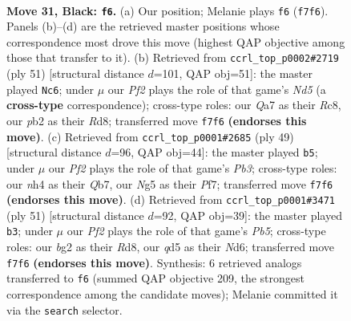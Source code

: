 \documentclass[11pt]{article}
\begin{document}
\clearpage

\begin{figure}[p]\centering
\begin{subfigure}{0.46\textwidth}\centering
\resizebox{\linewidth}{!}{%
\newchessgame
\chessboard[
  setfen={r2n1k2/qp3pp1/p7/3Q2np/7N/4P1P1/PP2RPBP/1R4K1 b - - 2 31},
  showmover=false,
  pgfstyle=straightmove, color=movearrow, markmove={f7-f6}
]}
\caption{}
\end{subfigure}\hfill
\begin{subfigure}{0.46\textwidth}\centering
\resizebox{\linewidth}{!}{%
\newchessgame
\chessboard[
  setfen={2rr2k1/p4pp1/1n5p/P3q3/1QpnPN2/5P2/R5PP/2B2RK1 b - - 4 26},
  showmover=false,
  pgfstyle=straightmove, color=movearrow, markmove={d4-c6}
]}
\caption{}
\end{subfigure}
\\[4pt]
\begin{subfigure}{0.46\textwidth}\centering
\resizebox{\linewidth}{!}{%
\newchessgame
\chessboard[
  setfen={2r3k1/1q1n1pp1/pp1Qpn1p/8/8/P1N1P2P/1P1R1PP1/4N1K1 b - - 1 25},
  showmover=false,
  pgfstyle=straightmove, color=movearrow, markmove={b6-b5}
]}
\caption{}
\end{subfigure}\hfill
\begin{subfigure}{0.46\textwidth}\centering
\resizebox{\linewidth}{!}{%
\newchessgame
\chessboard[
  setfen={3r2k1/2q2p2/np1npp1p/8/1pPP3P/3N2P1/1BR1QPK1/8 b - - 0 26},
  showmover=false,
  pgfstyle=straightmove, color=movearrow, markmove={b4-b3}
]}
\caption{}
\end{subfigure}
\caption{\textbf{Move 31, Black: \texttt{f6}.} (a) Our position; Melanie plays \texttt{f6} (\texttt{f7f6}). Panels (b)--(d) are the retrieved master positions whose correspondence most drove this move (highest QAP objective among those that transfer to it). (b) Retrieved from \texttt{ccrl\_top\_p0002\#2719} (ply 51) [structural distance $d$=101, QAP obj=51]: the master played \texttt{Nc6}; under $\mu$ our \emph{Pf2} plays the role of that game's \emph{Nd5} (a \textbf{cross-type} correspondence); cross-type roles: our \emph{Q}a7 as their \emph{R}c8, our \emph{p}b2 as their \emph{R}d8; transferred move \texttt{f7f6} \textbf{(endorses this move)}. (c) Retrieved from \texttt{ccrl\_top\_p0001\#2685} (ply 49) [structural distance $d$=96, QAP obj=44]: the master played \texttt{b5}; under $\mu$ our \emph{Pf2} plays the role of that game's \emph{Pb3}; cross-type roles: our \emph{n}h4 as their \emph{Q}b7, our \emph{N}g5 as their \emph{P}f7; transferred move \texttt{f7f6} \textbf{(endorses this move)}. (d) Retrieved from \texttt{ccrl\_top\_p0001\#3471} (ply 51) [structural distance $d$=92, QAP obj=39]: the master played \texttt{b3}; under $\mu$ our \emph{Pf2} plays the role of that game's \emph{Pb5}; cross-type roles: our \emph{b}g2 as their \emph{R}d8, our \emph{q}d5 as their \emph{N}d6; transferred move \texttt{f7f6} \textbf{(endorses this move)}. Synthesis: 6 retrieved analogs transferred to \texttt{f6} (summed QAP objective 209, the strongest correspondence among the candidate moves); Melanie committed it via the \texttt{search} selector.}
\label{fig:thought-m61}
\end{figure}
\end{document}
